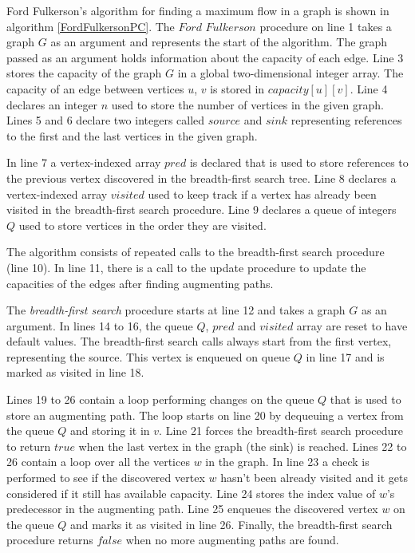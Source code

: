 \documentclass{l4proj}
\begin{document}
\noindent Ford Fulkerson's algorithm \cite{ford1956maximal} for finding a maximum flow in a graph is shown in algorithm \ref{FordFulkersonPC}. The $Ford$ $Fulkerson$ procedure on line 1 takes a graph $G$ as an argument and represents the start of the algorithm. The graph passed as an argument holds information about the capacity of each edge. Line 3 stores the capacity of the graph $G$ in a global two-dimensional integer array. The capacity of an edge between vertices $u$, $v$ is stored in $capacity[u][v]$. Line 4 declares an integer $n$ used to store the number of vertices in the given graph. Lines 5 and 6 declare two integers called $source$ and $sink$ representing references to the first and the last vertices in the given graph.

\noindent In line 7 a vertex-indexed array $pred$ is declared that is used to store references to the previous vertex discovered in the breadth-first search tree. Line 8 declares a vertex-indexed array $visited$ used to keep track if a vertex has already been visited in the breadth-first search procedure. Line 9 declares a queue of integers $Q$ used to store vertices in the order they are visited.

\noindent The algorithm consists of repeated calls to the breadth-first search procedure (line 10). In line 11, there is a call to the update procedure to update the capacities of the edges after finding augmenting paths.

\noindent The \textit{breadth-first search} procedure starts at line 12 and takes a graph $G$ as an argument. In lines 14 to 16, the queue $Q$, $pred$ and $visited$ array are reset to have default values. The breadth-first search calls always start from the first vertex, representing the source. This vertex is enqueued on queue $Q$ in line 17 and is marked as visited in line 18.

\noindent Lines 19 to 26 contain a loop performing changes on the queue $Q$ that is used to store an augmenting path. The loop starts on line 20 by dequeuing a vertex from the queue $Q$ and storing it in $v$. Line 21 forces the breadth-first search procedure to return $true$ when the last vertex in the graph (the sink) is reached. Lines 22 to 26 contain a loop over all the vertices $w$ in the graph. In line 23 a check is performed to see if the discovered vertex $w$ hasn't been already visited and it gets considered if it still has available capacity. Line 24 stores the index value of $w$'s predecessor in the augmenting path. Line 25 enqueues the discovered vertex $w$ on the queue $Q$ and marks it as visited in line 26. Finally, the breadth-first search procedure returns $false$ when no more augmenting paths are found.
\end{document}
